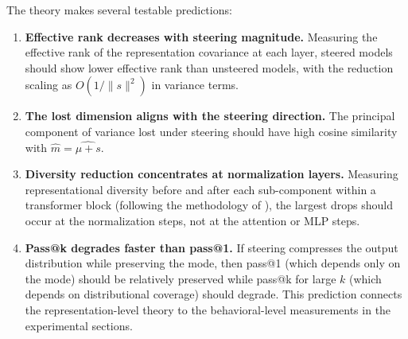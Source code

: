 The theory makes several testable predictions:

\begin{enumerate}
  \item \textbf{Effective rank decreases with steering magnitude.}
    Measuring the effective rank of the representation covariance at
    each layer, steered models should show lower effective rank than
    unsteered models, with the reduction scaling as
    $O(1/\|s\|^2)$ in variance terms.

  \item \textbf{The lost dimension aligns with the steering direction.}
    The principal component of variance lost under steering should
    have high cosine similarity with $\hat{m} = \widehat{\mu + s}$.

  \item \textbf{Diversity reduction concentrates at normalization layers.}
    Measuring representational diversity before and after each
    sub-component within a transformer block (following the
    methodology of \citet{sinii2025small}), the largest drops should
    occur at the normalization steps, not at the attention or MLP
    steps.

  \item \textbf{Pass@k degrades faster than pass@1.}
    If steering compresses the output distribution while preserving
    the mode, then pass@1 (which depends only on the mode) should
    be relatively preserved while pass@k for large $k$ (which depends
    on distributional coverage) should degrade.
    This prediction connects the representation-level theory to the
    behavioral-level measurements in the experimental sections.
\end{enumerate}
